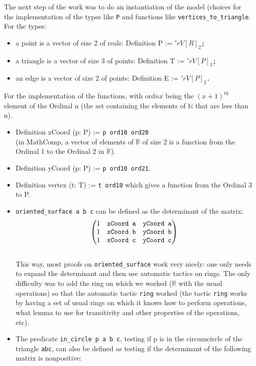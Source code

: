 \documentclass[a4paper,10pt]{article}
\def\definition#1#2{{\color{purple}Definition} {\color{blue}#1} := {\tt #2}}
\begin{document}
The next step of the work was to do an instantiation of the model (choices for the implementation of the types like {\tt P} and functions like {\tt vertices\_to\_triangle}. For the types:
\begin{itemize}
\item a point is a vector of size 2 of reals: \definition{P}{$'rV[R]_2$; }
\item a triangle is a vector of size 3 of points: \definition{T}{$'rV[P]_3$; }
\item an edge is a vector of size 2 of points: \definition{E}{$'rV[P]_2$. }
\end{itemize}
For the implementation of the functions, with ord$nx$ being the $(x+1)^{\text{th}}$ element of the Ordinal n (the set containing the elements of $\mathbb{N}$ that are less than n).
 \begin{itemize}
  \item \definition{xCoord (p: P)}{p ord10 ord20} \\(in {\sc MathComp}, a vector of elements of $\mathbb{R}$ of size 2 is a function from the Ordinal 1 to the Ordinal 2 in $\mathbb{R}$). 
  \item \definition{yCoord (p: P)}{p ord10 ord21}.
   \item \definition{vertex (t: T)}{t ord10} which gives a function from the Ordinal 3 to P.
\item {\tt oriented\_surface a b c} \label{oriented_surface} can be defined as the determinant of the matrix:
  $$ \left( \begin{matrix}
1 & \text{{\tt xCoord  a}} & \text{{\tt yCoord  a}}\\
1 & \text{{\tt xCoord  b}} & \text{{\tt yCoord  b}}\\
1 & \text{{\tt xCoord  c}} & \text{{\tt yCoord  c}}
\end{matrix} \right) $$\\
This way, most proofs on {\tt oriented\_surface} work very nicely: one only needs to expand the determinant and then use automatic tactics on rings. The only difficulty was to add the ring on which we worked ($\mathbb{R}$ with the usual operations) so that the automatic tactic {\tt ring} worked (the tactic {\tt ring} works by having a set of usual rings on which it knows how to perform operations, what lemma to use for transitivity and other properties of the operations, etc).

\item The predicate {\tt in\_circle p a b c}, testing if p is in the circumcircle of the triangle {\tt abc}, can also be defined as testing if the determinant of the following matrix is nonpositive:


\end{itemize}
\end{document}
